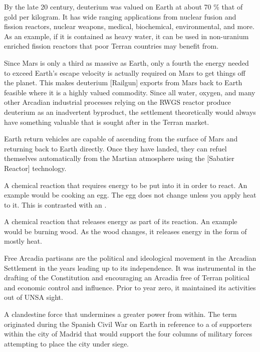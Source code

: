 By the late 20 century, deuterium was valued on Earth at about 70 \% that of gold per kilogram. It has wide ranging applications from nuclear fusion and fission reactors, nuclear weapons, medical, biochemical, environmental, and more. As an example, if it is contained as heavy water, it can be used in non-uranium enriched fission reactors that poor Terran countries may benefit from.

Since Mars is only a third as massive as Earth, only a fourth the energy needed to exceed Earth's escape velocity is actually required on Mars to get things off the planet. This makes deuterium [Railgun] exports from Mars back to Earth feasible where it is a highly valued commodity. Since all water, oxygen, and many other Arcadian industrial processes relying on the RWGS reactor produce deuterium as an inadvertent byproduct, the settlement theoretically would always have something valuable that is sought after in the Terran market.
\stopdefinition

Earth return vehicles are capable of ascending from the surface of Mars and returning back to Earth directly. Once they have landed, they can refuel themselves automatically from the Martian atmosphere using the [Sabatier Reactor] technology.
\stopdefinition

A chemical reaction that requires energy to be put into it in order to react. An example would be cooking an egg. The egg does not change unless you apply heat to it. This is contrasted with an .
\stopdefinition

A chemical reaction that releases energy as part of its reaction. An example would be burning wood. As the wood changes, it releases energy in the form of mostly heat.
\stopdefinition

Free Arcadia partisans are the political and ideological movement in the Arcadian Settlement in the years leading up to its independence. It was instrumental in the drafting of the Constitution and encouraging an Arcadia free of Terran political and economic control and influence. Prior to year zero, it maintained its activities out of UNSA sight.
\stopdefinition

A clandestine force that undermines a greater power from within. The term originated during the Spanish Civil War on Earth in reference to a  of supporters within the city of Madrid that would support the four columns of military forces attempting to place the city under siege.
\stopdefinition

